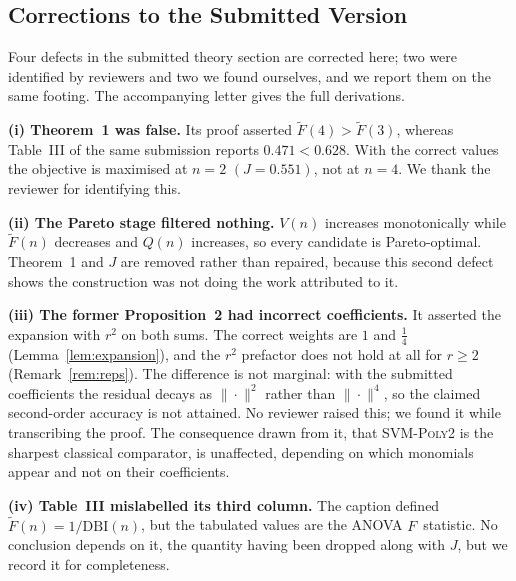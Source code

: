 \subsection{Corrections to the Submitted Version}
\label{sec:erratum}
\begin{revbody}

Four defects in the submitted theory section are corrected here; two were
identified by reviewers and two we found ourselves, and we report them on the
same footing. The accompanying letter gives the full derivations.

\textbf{(i) Theorem~1 was false.} Its proof asserted
$\widetilde{F}(4) > \widetilde{F}(3)$, whereas Table~III of the same submission
reports $0.471 < 0.628$. With the correct values the objective is maximised at
$n=2$ $(J=0.551)$, not at $n=4$. We thank the reviewer for identifying this.

\textbf{(ii) The Pareto stage filtered nothing.} $V(n)$ increases monotonically
while $\widetilde{F}(n)$ decreases and $Q(n)$ increases, so every candidate is
Pareto-optimal. Theorem~1 and $J$ are removed rather than repaired, because this
second defect shows the construction was not doing the work attributed to it.

\textbf{(iii) The former Proposition~2 had incorrect coefficients.} It asserted
the expansion with $r^{2}$ on both sums. The correct weights are $1$ and
$\tfrac{1}{4}$ (Lemma~\ref{lem:expansion}), and the $r^{2}$ prefactor does not hold
at all for $r\ge2$ (Remark~\ref{rem:reps}). The difference is not marginal: with
the submitted coefficients the residual decays as $\|\cdot\|^{2}$ rather than
$\|\cdot\|^{4}$, so the claimed second-order accuracy is not attained. No reviewer
raised this; we found it while transcribing the proof. The consequence drawn
from it, that SVM-\textsc{Poly2} is the sharpest classical comparator, is
unaffected, depending on which monomials appear and not on their coefficients.

\textbf{(iv) Table~III mislabelled its third column.} The caption defined
$\widetilde{F}(n)=1/\mathrm{DBI}(n)$, but the tabulated values are the ANOVA
$F$~statistic. No conclusion depends on it, the quantity having been dropped
along with $J$, but we record it for completeness.
\end{revbody}
